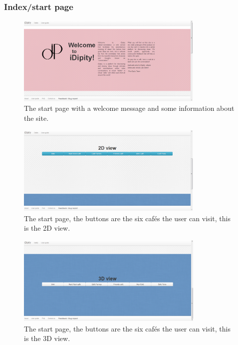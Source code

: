 \documentclass[12pt, titlepage]{article}
\begin{document}
\subsubsection{Index/start page}
\begin{figure}[H]
  \centering
	\includegraphics[width=0.8\textwidth,keepaspectratio]{indexpage1.png}
  \caption{The start page with a welcome message and some information about the site.}
\end{figure}
\begin{figure}[H]
  \centering
	\includegraphics[width=0.8\textwidth,keepaspectratio]{indexpage2.png}
  \caption{The start page, the buttons are the six cafés the user can visit, this is the 2D view.}
\end{figure}
\begin{figure}[H]
  \centering
	\includegraphics[width=0.8\textwidth,keepaspectratio]{indexpage3.png}
  \caption{The start page, the buttons are the six cafés the user can visit, this is the 3D view.}
\end{figure}
\end{document}
